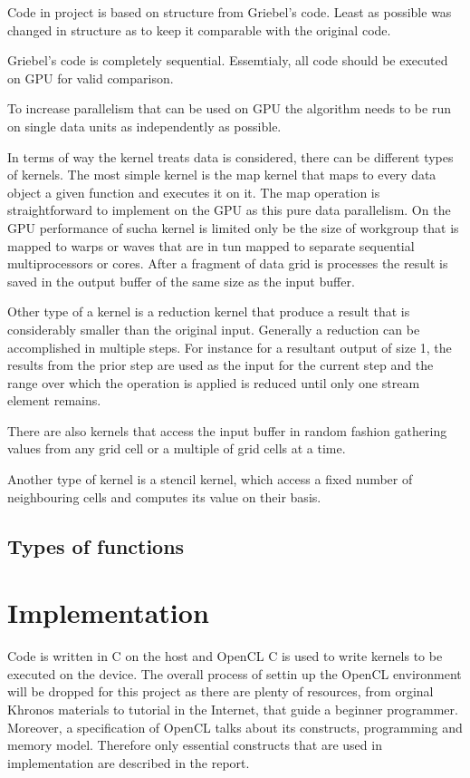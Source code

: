 Code in project is based on structure from Griebel's code. Least as possible was changed in structure as to keep it comparable with the original code.


Griebel's code is completely sequential. Essemtialy, all code should be executed on GPU for valid comparison. 

To increase parallelism that can be used on GPU the algorithm needs to be run on single data units as independently as possible.

In terms of way the kernel treats data is considered, there can be different types of kernels. The most simple kernel is the map kernel that maps to every data object a given function and executes it on it. The map operation is straightforward to implement on the GPU as this pure data parallelism. On the GPU performance of sucha kernel is limited only be the size of workgroup that is mapped to warps or waves that are in tun mapped to separate sequential multiprocessors or cores. After a fragment of data grid is processes the result is saved in the output buffer of the same size as the input buffer.

Other type of a kernel is a reduction kernel that produce a result that is considerably smaller than the original input. Generally a reduction can be accomplished in multiple steps. For instance for a resultant output of size 1, the results from the prior step are used as the input for the current step and the range over which the operation is applied is reduced until only one stream element remains.

There are also kernels that access the input buffer in random fashion gathering values from any grid cell or a multiple of grid cells at a time.

Another type of kernel is a stencil kernel, which access a fixed number of neighbouring cells and computes its value on their basis.

\subsection{Types of functions}


\section{Implementation}
Code is written in C on the host and OpenCL C is used to write kernels to be executed on the device. The overall process of settin up the OpenCL environment will be dropped for this project as there are plenty of resources, from orginal Khronos materials to tutorial in the Internet, that guide a beginner programmer. Moreover, a specification of OpenCL talks about its constructs, programming and memory model. Therefore only essential constructs that are used in implementation are described in the report. 

